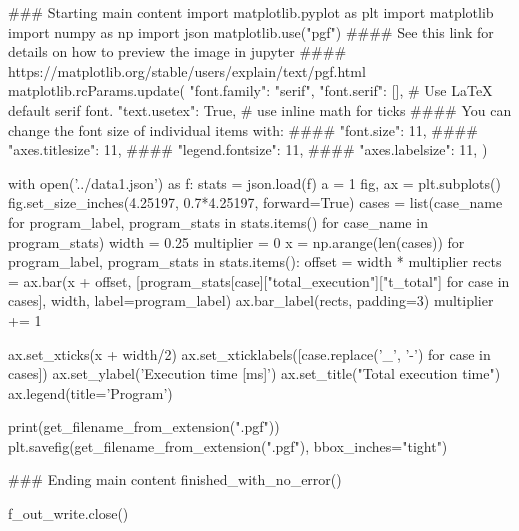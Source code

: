 ### Starting main content
import matplotlib.pyplot as plt
import matplotlib
import numpy as np
import json
matplotlib.use("pgf")
#### See this link for details on how to preview the image in jupyter
#### https://matplotlib.org/stable/users/explain/text/pgf.html
matplotlib.rcParams.update({
  "font.family": "serif",
  "font.serif": [], # Use LaTeX default serif font.
  "text.usetex": True, # use inline math for ticks
  #### You can change the font size of individual items with:
  #### "font.size": 11,
  #### "axes.titlesize": 11,
  #### "legend.fontsize": 11,
  #### "axes.labelsize": 11,
})

with open('../data1.json') as f:
    stats = json.load(f)
a = 1
fig, ax = plt.subplots()
fig.set_size_inches(4.25197, 0.7*4.25197, forward=True)
cases = list({case_name for program_label, program_stats in stats.items() for case_name in program_stats})
width = 0.25
multiplier = 0
x = np.arange(len(cases))
for program_label, program_stats in stats.items():
    offset = width * multiplier
    rects = ax.bar(x + offset, [program_stats[case]["total_execution"]["t_total"] for case in cases], width, label=program_label)
    ax.bar_label(rects, padding=3)
    multiplier += 1

ax.set_xticks(x + width/2)
ax.set_xticklabels([case.replace('_', '-') for case in cases])
ax.set_ylabel('Execution time [ms]')
ax.set_title("Total execution time")
ax.legend(title='Program')

print(get_filename_from_extension(".pgf"))
plt.savefig(get_filename_from_extension(".pgf"), bbox_inches="tight")




### Ending main content
finished_with_no_error()


f_out_write.close()




